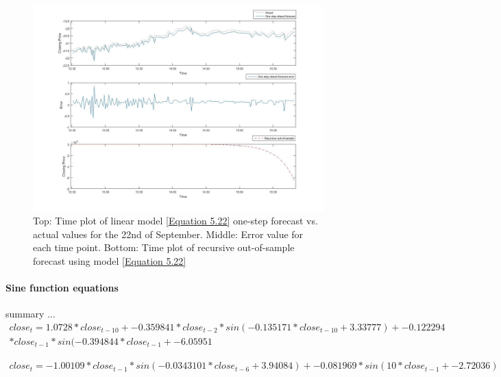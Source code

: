 \documentclass[13pt]{report}
\begin{document}
\begin{figure}[H]
\centering
\label{VWlinear22fig}
\includegraphics[width=\textwidth]{22linear}
\caption{Top: Time plot of linear model \ref{Equation 5.22} one-step forecast vs. actual values for the 22nd of September. Middle: Error value for each time point. Bottom: Time plot of recursive out-of-sample forecast using model \ref{Equation 5.22}}
\end{figure}

\paragraph{Sine function equations}\hfill \break
summary ...
\begin{equation}
\begin{align*}
close_{t} = 1.0728 * close_{t-10} + -0.359841 * close_{t-2} * sin ( -0.135171 * close_{t-10} + 3.33777 ) + -0.122294 \\ * close_{t-1} * sin ( -0.394844 * close_{t-1} + -6.05951
\end{align*}
\label{Equation 5.23}
\end{equation}

\begin{equation}
\begin{align*}
close_{t} = -1.00109 * close_{t-1} * sin ( -0.0343101 * close_{t-6} + 3.94084 ) + -0.081969 * sin ( 10 * close_{t-1} + -2.72036 )
\end{align*}
\label{Equation 5.24}
\end{equation}
\end{document}

